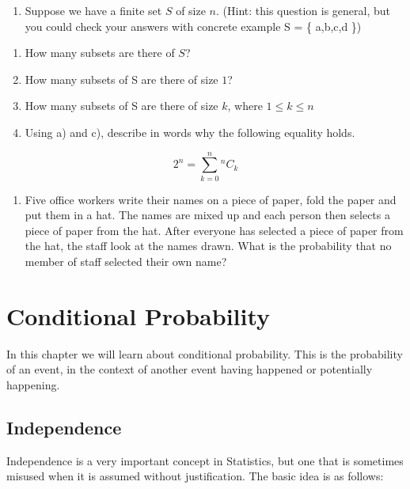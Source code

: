 \documentclass[
]{book}
\providecommand{\tightlist}{%
  \setlength{\itemsep}{0pt}\setlength{\parskip}{0pt}}
\theoremstyle{definition}
\theoremstyle{definition}
\theoremstyle{definition}
\theoremstyle{definition}
\theoremstyle{remark}
\begin{document}
\begin{enumerate}
\def\labelenumi{\arabic{enumi}.}
\setcounter{enumi}{3}
\tightlist
\item
  Suppose we have a finite set \(S\) of size \(n\).
  (Hint: this question is general, but you could check your answers with concrete example S = \{ a,b,c,d \})
\end{enumerate}

\begin{enumerate}
\def\labelenumi{\alph{enumi})}
\item
  How many subsets are there of \(S\)?
\item
  How many subsets of S are there of size \(1\)?
\item
  How many subsets of S are there of size \(k\), where \(1\leq k\leq n\)
\item
  Using a) and c), describe in words why the following equality holds.
\end{enumerate}

\[2^n = \sum_{k=0}^n {^n}C_k\]

\begin{enumerate}
\def\labelenumi{\arabic{enumi}.}
\setcounter{enumi}{4}
\tightlist
\item
  Five office workers write their names on a piece of paper, fold the paper and put them in a hat. The names are mixed up and each person then selects a piece of paper from the hat. After everyone has selected a piece of paper from the hat, the staff look at the names drawn. What is the probability that no member of staff selected their own name?
\end{enumerate}

\hypertarget{cond}{%
\chapter{Conditional Probability}\label{cond}}

In this chapter we will learn about conditional probability. This is the probability of an event, in the context of another event having happened or potentially happening.

\hypertarget{independence}{%
\section{Independence}\label{independence}}

Independence is a very important concept in Statistics, but one that is sometimes misused when it is assumed without justification. The basic idea is as follows:
\end{document}
